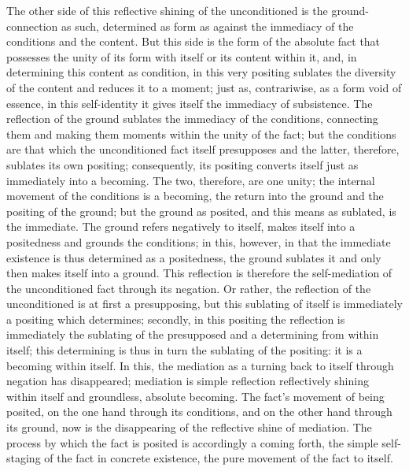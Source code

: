 The other side of this reflective shining of
the unconditioned is the ground-connection as such,
determined as form as against the immediacy
of the conditions and the content.
But this side is the form of the absolute fact
that possesses the unity of its form with itself
or its content within it,
and, in determining this content as condition,
in this very positing sublates the diversity of the content
and reduces it to a moment;
just as, contrariwise, as a form void of essence,
in this self-identity it gives itself
the immediacy of subsistence.
The reflection of the ground
sublates the immediacy of the conditions,
connecting them and making them
moments within the unity of the fact;
but the conditions are that which
the unconditioned fact itself presupposes
and the latter, therefore, sublates its own positing;
consequently, its positing converts itself
just as immediately into a becoming.
The two, therefore, are one unity;
the internal movement of the conditions is a becoming,
the return into the ground and the positing of the ground;
but the ground as posited, and this means as sublated, is the immediate.
The ground refers negatively to itself,
makes itself into a positedness and grounds the conditions;
in this, however, in that the immediate existence is
thus determined as a positedness,
the ground sublates it and only then makes itself into a ground.
This reflection is therefore the self-mediation of
the unconditioned fact through its negation.
Or rather, the reflection of the unconditioned is
at first a presupposing,
but this sublating of itself is
immediately a positing which determines;
secondly, in this positing the reflection is
immediately the sublating of the presupposed
and a determining from within itself;
this determining is thus in turn the sublating of the positing:
it is a becoming within itself.
In this, the mediation as a turning back
to itself through negation has disappeared;
mediation is simple reflection
reflectively shining within itself
and groundless, absolute becoming.
The fact's movement of being posited,
on the one hand through its conditions,
and on the other hand through its ground,
now is the disappearing of
the reflective shine of mediation.
The process by which the fact is posited
is accordingly a coming forth,
the simple self-staging of
the fact in concrete existence,
the pure movement of the fact to itself.

